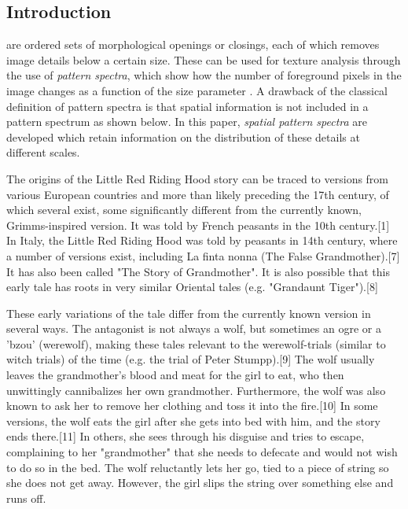 \documentclass[plainboxedsections, 25pt, a1]{sciposter}
\begin{document}
\begin{multicols}{3}






\section{Introduction}



 

 are ordered sets of morphological openings or closings, each of
which removes image details below a certain size. These can be used for texture
analysis
through the use of \emph{pattern spectra}, which show how the number of 
foreground pixels in the image changes as a function of the size parameter 
\cite{maragos89:_patter}.
A drawback of the classical definition of pattern spectra is that spatial 
information is not included in a pattern spectrum as shown below.
 In this paper, \emph{spatial pattern spectra} are developed which retain information on the distribution of these details at different scales.

The origins of the Little Red Riding Hood story can be traced to versions from various European countries and more than likely preceding the 17th century, of which several exist, some significantly different from the currently known, Grimms-inspired version. It was told by French peasants in the 10th century.[1] In Italy, the Little Red Riding Hood was told by peasants in 14th century, where a number of versions exist, including La finta nonna (The False Grandmother).[7] It has also been called "The Story of Grandmother". It is also possible that this early tale has roots in very similar Oriental tales (e.g. "Grandaunt Tiger").[8]

These early variations of the tale differ from the currently known version in several ways. The antagonist is not always a wolf, but sometimes an ogre or a 'bzou' (werewolf), making these tales relevant to the werewolf-trials (similar to witch trials) of the time (e.g. the trial of Peter Stumpp).[9] The wolf usually leaves the grandmother’s blood and meat for the girl to eat, who then unwittingly cannibalizes her own grandmother. Furthermore, the wolf was also known to ask her to remove her clothing and toss it into the fire.[10] In some versions, the wolf eats the girl after she gets into bed with him, and the story ends there.[11] In others, she sees through his disguise and tries to escape, complaining to her "grandmother" that she needs to defecate and would not wish to do so in the bed. The wolf reluctantly lets her go, tied to a piece of string so she does not get away. However, the girl slips the string over something else and runs off.


\end{multicols}
\end{document}
